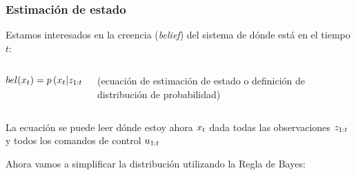 \begin{frame}
	\frametitle{Estimación de estado}
	
	Estamos interesados en la creencia (\emph{belief}) del sistema de dónde está en el tiempo $t$:
    
    \begin{columns}[t]
        \begin{column}{0.5\textwidth}
        	\begin{equation}
            bel(x_{t}) = p\left(x_{t} | z_{1:t}, u_{1:t} \right)
            \end{equation}
        \end{column}
        \begin{column}{0.5\textwidth}
        (ecuación de estimación de estado o definición de distribución de probabilidad)
        \end{column}
    \end{columns}
    \vspace{1cm}
    La ecuación se puede leer dónde estoy ahora $x_{t}$ dada todas las observaciones $z_{1:t}$ y todos los comandos de control $u_{1:t}$

    Ahora vamos a simplificar la distribución utilizando la Regla de Bayes:

\end{frame}


